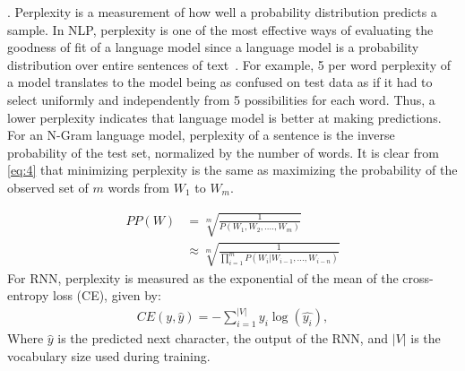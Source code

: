 . 
Perplexity is a measurement of how well a probability distribution predicts a sample. In NLP, perplexity is one of the most effective ways of evaluating the goodness of fit of a language model since a language model is a probability distribution over entire sentences of text~\cite{azzopardi2003investigating}. For example, 5 per word perplexity of a model translates to the model being as confused on test data as if it had to select uniformly and independently from 5 possibilities for each word. Thus, a lower perplexity indicates that language model is better at making predictions.
For an N-Gram language model, perplexity of a sentence is the inverse probability of
the test set, normalized by the number of words. It is clear from \eqref{eq:4} that minimizing perplexity is the same as maximizing the probability of the observed set of $m$ words from $W_{1}$ to $W_{m}$.

\begin{equation}\label{eq:4}
\begin{aligned}
PP(W) &= \sqrt[m]{\frac{1}{P(W_{1},W_{2},....,W_{m})}}\\
&\approx \sqrt[m]{\frac{1}{\displaystyle \prod_{i=1}^{m}P(W_{i} | W_{i-1},...,W_{i-n})}}
\end{aligned}
\end{equation}
For RNN, perplexity is measured as the exponential of the mean of the cross-entropy loss (CE), given by:
\begin{equation}
\begin{aligned}
CE(y, \hat{y}) = - \sum_{i=1}^{|V|} y_{i}\log(\hat{y_i}),
\end{aligned}
\end{equation}
Where $\hat{y}$ is the predicted next character, the output of the RNN, and $|V|$ is the vocabulary size used during training. 
